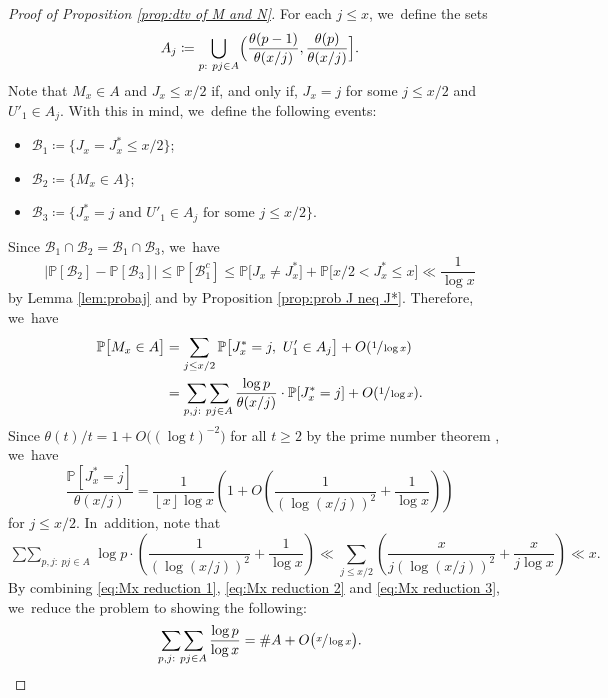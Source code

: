 \documentclass[11pt]{article}
\newcommand{\bigO}[1]{O(#1)}
\newcommand{\PP}{\mathbb{P}}
\newcommand{\BC}{\mathcal{B}}
\newcommand{\bigoo}[1]{O\!\left(#1 \right)}
\newcommand{\floor}[1]{\left\lfloor #1 \right\rfloor}
\newcommand{\bg}{\big}
\newcommand{\bgg}{\Big}
\theoremstyle{plain}
\theoremstyle{definition}
\begin{document}
\begin{proof}[Proof of Proposition \ref{prop:dtv of M and N}]
For each $j \le x$, we~define the sets
\[
A_j \coloneqq \bigcup_{\substack{p:\ pj \in A}} \Bigl(\frac{\theta(p-1)}{\theta(x/j)}, \frac{\theta(p)}{\theta(x/j)}\Bigr].
\]
Note that $M_x \in A$ and $J_x \le x/2$ if, and only if, $J_x=j$ for some $j\le x/2$ and $U'_1 \in A_j$. With this in mind, we~define the following events:
\begin{itemize}
\item $\mathcal B_1 \coloneqq \{J_x=J_x^* \le x/2\}$;
\item $\mathcal B_2 \coloneqq \{ M_x \in A\}$;
\item $\mathcal B_3 \coloneqq \{\mbox{$J_x^* = j$ and $U'_1 \in A_j$ for some $j\le x/2$}\}$.
\end{itemize}
Since $\mathcal B_1 \cap \mathcal B_2 = \mathcal B_1 \cap \mathcal B_3$, we~have
\[
\bgg|\PP[\BC_2] - \PP[\BC_3]\bgg| \le \PP[\BC_1^c] \le \PP\bg[J_x \ne J_x^*\bg] + \PP\bg[x/2< J_x^* \le x\bg] \ll \frac{1}{\log x}
\]
by Lemma \ref{lem:probaj} and by Proposition \ref{prop:prob J neq J*}. Therefore, we~have
\begin{equation}
\label{eq:Mx reduction 1}
\begin{aligned}
\PP\bg[M_x \in A\bg]
&= \sum_{j \le x/2} \PP\bg[J_x^* = j,\ U'_1 \in A_j\bg] + \bigO{\sfrac{1}{\log x}} \\
&= \mathop{\sum\sum}_{p,j:\ pj \in A} \frac{\log p}{\theta(x/j)}\cdot \PP[J_x^* = j] + \bigO{\sfrac{1}{\log x}}.
\end{aligned}
\end{equation}
Since $\theta(t)/t = 1 + O\bg((\log t)^{-2}\bg)$ for all $t \ge 2$ by the prime number theorem \cite[Th.\,8.1]{Koukoulo19}, we~have
\begin{equation}
\label{eq:Mx reduction 2}
\frac{\PP[J_x^* = j]}{\theta(x/j)} = \frac{1}{\floor x \log x}\left(1+\bigoo{\frac{1}{(\log(x/j))^2}+\frac{1}{\log x}}\right)
\end{equation}
for $j\le x/2$. In~addition, note that
\begin{equation}
\label{eq:Mx reduction 3}
\mathop{\sum\sum}_{p,j:\ pj \in A} \log p \cdot \left(\frac{1}{(\log(x/j))^2} + \frac{1}{\log x}\right) \ll \sum_{j \le x/2} \left(\frac{x}{j(\log(x/j))^2} + \frac{x}{j\log x}\right) \ll x.
\end{equation}
By combining \eqref{eq:Mx reduction 1}, \eqref{eq:Mx reduction 2} and \eqref{eq:Mx reduction 3}, we~reduce the problem to showing the following:
\begin{equation}
\label{eq:Mx reduction 4}
\mathop{\sum\sum}_{p,j:\ pj \in A} \frac{\log p}{\log x} = \# A + O\bg(\sfrac{x}{\log x}\bg).

\end{equation}
\end{proof}
\end{document}
